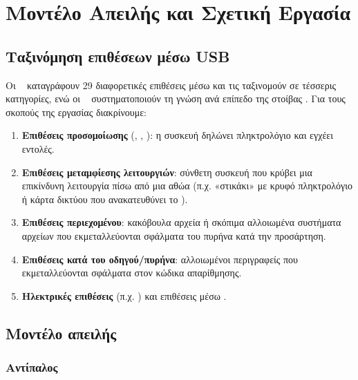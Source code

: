 \chapter{Μοντέλο Απειλής και Σχετική Εργασία}
\label{ch:related}

\section{Ταξινόμηση επιθέσεων μέσω USB}
\label{sec:attack-taxonomy}

Οι ~\cite{nissim2017usbattacks} καταγράφουν 29 διαφορετικές
επιθέσεις μέσω  και τις ταξινομούν σε τέσσερις κατηγορίες, ενώ οι
~\cite{tian2018sok} συστηματοποιούν τη γνώση ανά επίπεδο της
στοίβας . Για τους σκοπούς της εργασίας διακρίνουμε:

\begin{enumerate}
  \item \textbf{Επιθέσεις προσομοίωσης } (, ,
        ): η συσκευή δηλώνει πληκτρολόγιο και εγχέει εντολές.
  \item \textbf{Επιθέσεις μεταμφίεσης λειτουργιών}: σύνθετη συσκευή που κρύβει
        μια επικίνδυνη λειτουργία πίσω από μια αθώα (π.χ. «στικάκι» με κρυφό
        πληκτρολόγιο ή κάρτα δικτύου που ανακατευθύνει το ).
  \item \textbf{Επιθέσεις περιεχομένου}: κακόβουλα αρχεία ή σκόπιμα
        αλλοιωμένα συστήματα αρχείων που εκμεταλλεύονται σφάλματα του πυρήνα κατά
        την προσάρτηση.
  \item \textbf{Επιθέσεις κατά του οδηγού/πυρήνα}: αλλοιωμένοι περιγραφείς που
        εκμεταλλεύονται σφάλματα στον κώδικα απαρίθμησης.
  \item \textbf{Ηλεκτρικές επιθέσεις} (π.χ. ) και επιθέσεις
         μέσω .
\end{enumerate}

\section{Μοντέλο απειλής}
\label{sec:threat-model}

\subsection{Αντίπαλος}

